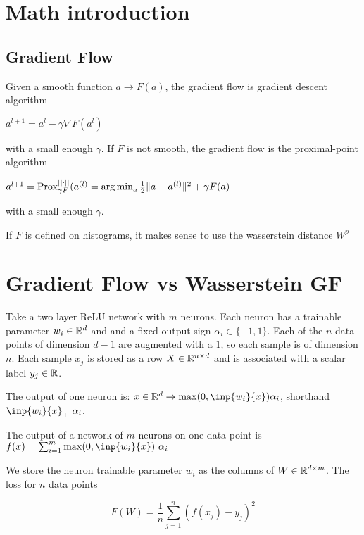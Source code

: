 \section{Math introduction}

\subsection{Gradient Flow}

Given a smooth function $a \rightarrow F(a)$, the gradient flow is gradient descent algorithm

$a^{l+1} = a^l - \gamma \nabla F(a^l)$

with a small enough $\gamma$. If $F$ is not smooth, the gradient flow is the proximal-point algorithm

$a^{l+1} = \operatorname{Prox}^{||\cdot ||}_{\gamma F}(a^{(l)} = \operatorname*{arg\,min}_a \frac{1}{2} \lVert a - a^{(l)}\rVert^2 + \gamma F(a)$

with a small enough $\gamma$.

If $F$ is defined on histograms, it makes sense to use the wasserstein distance $W^p$





\section{Gradient Flow vs Wasserstein GF}

Take a two layer ReLU network with $m$ neurons. Each neuron has a trainable parameter $w_i \in \mathbb{R}^d$ and and a fixed output sign $\alpha_i \in \{-1, 1\}$. Each of the $n$ data points of dimension $d-1$ are augmented with a $1$, so each sample is of dimension $n$. Each sample $x_j$ is stored as a row $X \in \mathbb{R}^{n \times d}$  and is associated with a scalar label $y_j \in \mathbb{R}$.

The output of one neuron is: $x \in \R^d \rightarrow \max(0, \inp{w_i}{x}) \alpha_i$, shorthand $\inp{w_i}{x}_+ ~ \alpha_i$.

The output of a network of $m$ neurons on one data point is $f(x) = \sum_{i=1}^{m} \max(0, \inp{w_i}{x}) ~ \alpha_i$

We store the neuron trainable parameter $w_i$ as the columns of $W \in \mathbb{R}^{d \times m}$. The loss for $n$ data points

\begin{equation}
	F(W) = \frac{1}{n} \sum_{j=1}^{n} \left(f(x_j) - y_j\right)^2
\end{equation}

